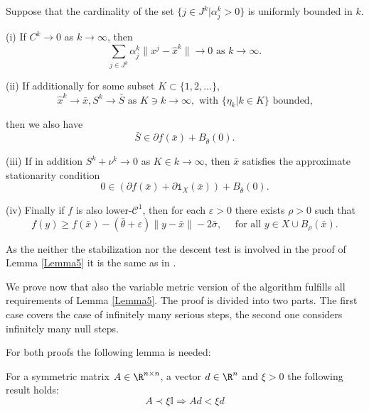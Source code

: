 \begin{lemma}\label{Lemma5}
	Suppose that the cardinality of the set \(\{j \in J^k| \alpha_j^k > 0\}\) is uniformly bounded in \(k\).
	
	(i) If \(C^k \to 0\) as \(k \to \infty\), then 
	\[ \sum_{j \in J^k}\alpha_j^k\|x^j-\hat{x}^k\| \to 0 \text{ as } k \to \infty. \]
	
	(ii) If additionally for some subset \(K \subset \{1,2,\dots\}\),
	\[\hat{x}^k \to \bar{x}, S^k \to \bar{S} \text{ as } K \ni k \to \infty, \text{ with } \{\eta_k|k \in K\} \text{ bounded,} \]
	
	then we also have 
	\[\bar{S} \in \partial f(\bar{x})+B_{\bar{\theta}}(0).\]
	
	(iii) If in addition \(S^k + \nu^k \to 0\) as \(K \in k \to \infty\), then \(\bar{x}\) satisfies the approximate stationarity condition 
	\begin{equation}
		0 \in \left(\partial f(\bar{x}) + \partial \mathtt{i}_X(\bar{x}) \right) + B_{\bar{\theta}}(0).
	\end{equation}
	
	(iv) Finally if \(f\) is also lower-\(\mathcal{C}^1\), then for each \(\varepsilon > 0\) there exists \(\rho > 0\) such that
	\begin{equation}
		f(y) \geq f(\bar{x})-(\bar{\theta}+\varepsilon)\|y-\bar{x}\|-2\bar{\sigma}, \quad \text{ for all } y \in X\cup B_{\rho}(\bar{x}).
	\end{equation}
\end{lemma}

As the neither the stabilization nor the descent test is involved in the proof of Lemma \ref{Lemma5} it is the same as in \cite{Hare2016}.

We prove now that also the variable metric version of the algorithm fulfills all requirements of Lemma \ref{Lemma5}.
The proof is divided into two parts. The first case covers the case of infinitely many serious steps, the second one considers infinitely many null steps.

For both proofs the following lemma is needed:

\begin{lemma}
	For a symmetric matrix \(A \in \R^{n\times n}\), a vector \(d\in \R^n\) and \(\xi > 0\) the following result holds: 
	\[ A \prec \xi \mathbb{I} \Rightarrow Ad < \xi d \]
\end{lemma}

